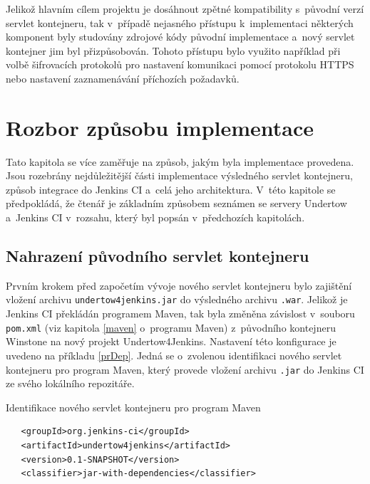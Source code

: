         \medskip
        Jelikož hlavním cílem projektu je dosáhnout zpětné kompatibility s~původní verzí servlet kontejneru,
        tak v~případě nejasného přístupu k~implementaci některých komponent byly studovány zdrojové kódy
        původní implementace a~nový servlet kontejner jim byl přizpůsobován. Tohoto přístupu bylo využito
        například při volbě šifrovacích protokolů pro nastavení komunikaci pomocí protokolu HTTPS nebo nastavení zaznamenávání
        příchozích požadavků.
        
     \section{Rozbor způsobu implementace} \label{implDetail}
        Tato kapitola se více zaměřuje na způsob, jakým byla implementace provedena. Jsou rozebrány nejdůležitější
        části implementace výsledného servlet kontejneru, způsob integrace do Jenkins CI
        a~celá jeho architektura. V~této kapitole se předpokládá, že čtenář je
        základním způsobem seznámen se servery Undertow a~Jenkins CI v~rozsahu, který byl popsán
        v~předchozích kapitolách.


        \subsection{Nahrazení původního servlet kontejneru}
            Prvním krokem před započetím vývoje nového servlet kontejneru bylo zajištění vložení archivu \texttt{undertow4jenkins.jar} 
            do výsledného archivu \texttt{.war}.
            Jelikož je Jenkins CI překládán programem Maven, tak byla změněna závislost v~souboru \texttt{pom.xml} 
            (viz kapitola \ref{maven} o~programu Maven)
            z~původního kontejneru Winstone na nový projekt Undertow4Jenkins.
            Nastavení této konfigurace je uvedeno na příkladu \ref{prDep}. Jedná se o~zvolenou identifikaci nového servlet
            kontejneru pro program Maven, který provede vložení archivu \texttt{.jar} do Jenkins CI ze svého lokálního repozitáře.

\begin{priklad} \label{prDep} Identifikace nového servlet kontejneru pro program Maven 
\begin{verbatim}
   <groupId>org.jenkins-ci</groupId>
   <artifactId>undertow4jenkins</artifactId>
   <version>0.1-SNAPSHOT</version>
   <classifier>jar-with-dependencies</classifier>
\end{verbatim}
\end{priklad}

